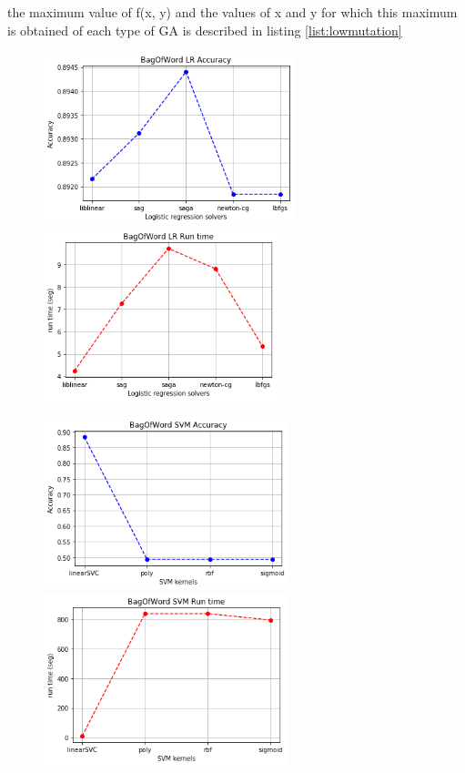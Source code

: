 \documentclass[oneside,onecolumn]{article}
\begin{document}
the maximum value of f(x, y) and the values of x and y for which this maximum is obtained of each type of GA is described in listing \ref{list:lowmutation}
\begin{figure}[H]
	\centering

	\includegraphics[height=5cm]{report_plot/plot_bagofword/logistic_regression_accuracy.png}
	\includegraphics[height=5cm]{report_plot/plot_bagofword/logistic_regression_runtime.png}
	
	\includegraphics[height=5cm]{report_plot/plot_bagofword/svm_accuracy.png}
	\includegraphics[height=5cm]{report_plot/plot_bagofword/svm_runtime.png}
	

\end{figure}
\end{document}

